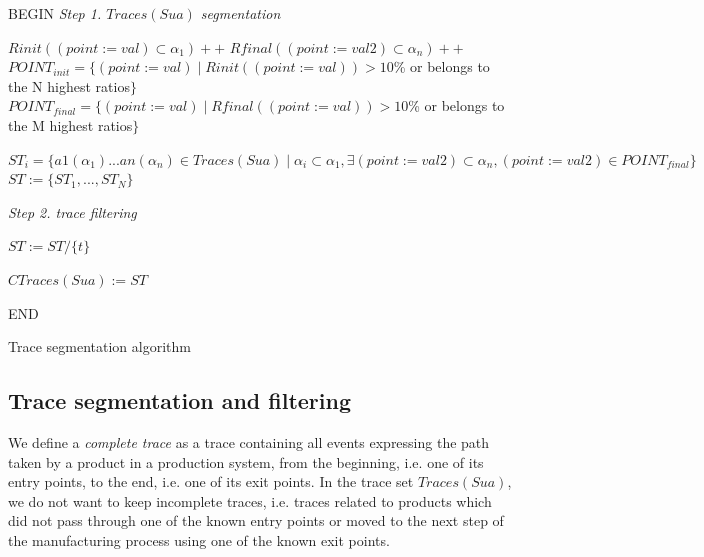 \begin{algorithm}[h]


\BlankLine
BEGIN\;
\emph{Step 1. $Traces(Sua)$ segmentation}

 {
$Rinit((point:=val)\subset \alpha_1)++$\;
$Rfinal((point:=val2)\subset \alpha_n)++$\;
}
$POINT_{init}=\{(point:=val) \mid Rinit((point:=val))>10$\% or belongs to the N highest ratios$\}$\;
$POINT_{final}=\{(point:=val) \mid Rfinal((point:=val))>10$\% or belongs to the M highest ratios$\}$\;
\BlankLine

 {
	$ST_i=\{a1(\alpha_1)...an(\alpha_n)\in Traces(Sua) \mid \alpha_i\subset \alpha_1, \exists (point:=val2)\subset \alpha_n, (point:=val2)\in POINT_{final}    \}$\;
}
$ST:=\{ST_1,...,ST_N\}$\;

\BlankLine
\emph{Step 2. trace filtering}

 {
	{
		$ST:= ST/ \{  t \}$\;
	}


	}

    $CTraces(Sua) := ST$

END\;

\caption{Trace segmentation algorithm}
\label{algo_traces}
\end{algorithm}

\subsection{Trace segmentation and filtering}
\label{sec:modelinf:prodsystems:segmentation}

We define a \textit{complete trace} as a trace containing all
events expressing the path taken by a product in a production
system, from the beginning, i.e. one of its entry points, to the
end, i.e. one of its exit points. In the trace set $Traces(Sua)$,
we do not want to keep incomplete traces, i.e. traces related to
products which did not pass through one of the known entry points
or moved to the next step of the manufacturing process using one
of the known exit points.

